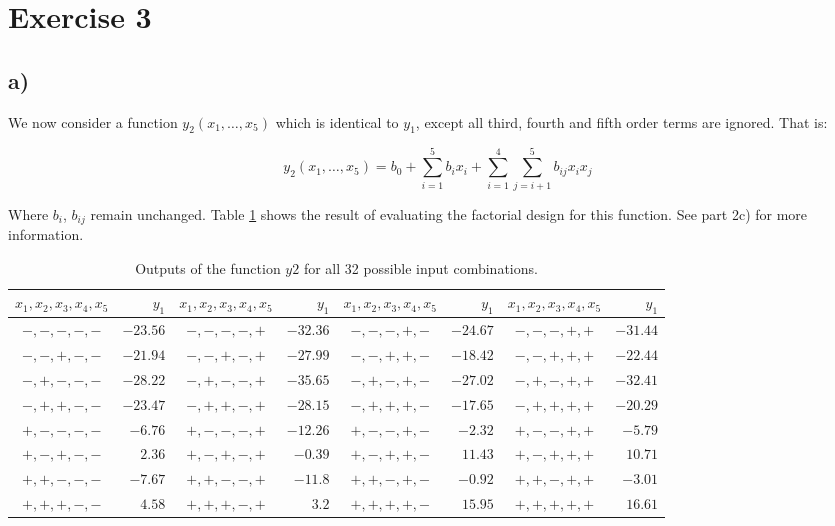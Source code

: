 \section*{Exercise 3}

\subsection*{a)}

We now consider a function $y_2(x_1, \dots, x_5)$ which is identical to $y_1$, except all third, fourth and fifth order terms are ignored. That is:

\begin{equation}
	y_2(x_1, \dots, x_5) = b_0 + \sum_{i=1}^{5} b_i x_i + \sum_{i=1}^{4} \sum_{j=i+1}^{5} b_{ij} x_i x_j
\end{equation}

Where $b_i$, $b_{ij}$ remain unchanged. Table \ref{tab:outputs_y2} shows the result of evaluating the factorial design for this function. See part 2c) for more information.

\begin{table}[h!]
	\centering
	\begin{tabular}{cr|cr|cr|cr}
		$x_1, x_2, x_3, x_4, x_5$ &    $y_1$ & $x_1, x_2, x_3, x_4, x_5$ &    $y_1$ & $x_1, x_2, x_3, x_4, x_5$ &    $y_1$ & $x_1, x_2, x_3, x_4, x_5$ &    $y_1$ \\
		\hline
		       $-,-,-,-,-$        & $-23.56$ &        $-,-,-,-,+$        & $-32.36$ &        $-,-,-,+,-$        & $-24.67$ &        $-,-,-,+,+$        & $-31.44$ \\
		       $-,-,+,-,-$        & $-21.94$ &        $-,-,+,-,+$        & $-27.99$ &        $-,-,+,+,-$        & $-18.42$ &        $-,-,+,+,+$        & $-22.44$ \\
		       $-,+,-,-,-$        & $-28.22$ &        $-,+,-,-,+$        & $-35.65$ &        $-,+,-,+,-$        & $-27.02$ &        $-,+,-,+,+$        & $-32.41$ \\
		       $-,+,+,-,-$        & $-23.47$ &        $-,+,+,-,+$        & $-28.15$ &        $-,+,+,+,-$        & $-17.65$ &        $-,+,+,+,+$        & $-20.29$ \\
		       $+,-,-,-,-$        &  $-6.76$ &        $+,-,-,-,+$        & $-12.26$ &        $+,-,-,+,-$        &  $-2.32$ &        $+,-,-,+,+$        &  $-5.79$ \\
		       $+,-,+,-,-$        &   $2.36$ &        $+,-,+,-,+$        &  $-0.39$ &        $+,-,+,+,-$        &  $11.43$ &        $+,-,+,+,+$        &  $10.71$ \\
		       $+,+,-,-,-$        &  $-7.67$ &        $+,+,-,-,+$        &  $-11.8$ &        $+,+,-,+,-$        &  $-0.92$ &        $+,+,-,+,+$        &  $-3.01$ \\
		       $+,+,+,-,-$        &   $4.58$ &        $+,+,+,-,+$        &    $3.2$ &        $+,+,+,+,-$        &  $15.95$ &        $+,+,+,+,+$        &  $16.61$ \\
	\end{tabular}
	\caption{Outputs of the function $y2$ for all 32 possible input combinations.}
	\label{tab:outputs_y2}
\end{table}

